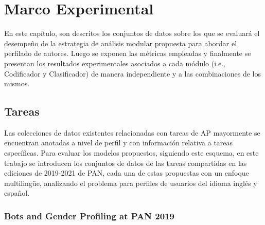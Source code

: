 \chapter{Marco Experimental}


En este capítulo, son descritos los conjuntos de datos sobre los que se evaluará el desempeño de la estrategia de análisis modular propuesta para abordar el perfilado de autores. Luego se exponen las métricas empleadas y finalmente se presentan los resultados experimentales asociados a cada módulo (i.e., Codificador y Clasificador) de manera independiente y a las combinaciones de los mismos.
	
\section{Tareas}
	 
	 Las colecciones de datos existentes relacionadas con tareas de AP mayormente se encuentran anotadas a nivel de perfil y con información relativa a tareas específicas. Para evaluar los modelos propuestos, siguiendo este esquema, en este trabajo se introducen los conjuntos de datos de las tareas compartidas en las ediciones de 2019-2021 de PAN, cada una de estas propuestas con un enfoque multilingüe, analizando el problema para perfiles de usuarios del idioma inglés y español.
	 
	 \subsection{Bots and Gender Profiling at PAN 2019}
	 

